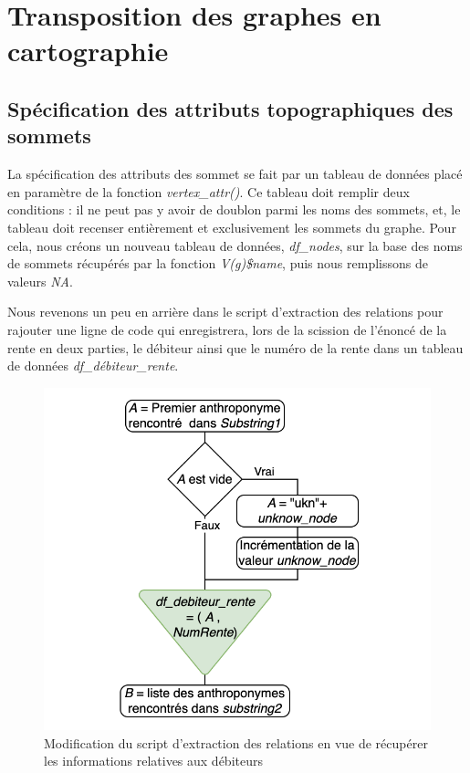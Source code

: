 \section{Transposition des graphes en cartographie}

\subsection{Spécification des attributs topographiques des sommets}
La spécification des attributs des sommet se fait par un tableau de données placé en paramètre de la fonction \textit{vertex\_attr()}. Ce tableau doit remplir deux conditions  : il ne peut pas y avoir de doublon parmi  les noms des sommets, et,  le tableau doit recenser entièrement et exclusivement  les sommets du graphe.
Pour cela,  nous créons un nouveau tableau de données, \textit{df\_nodes}, sur la base des noms de sommets récupérés par la fonction \textit{V(g)\$name}, puis nous remplissons de valeurs \textit{NA}.

Nous revenons un peu en arrière dans le script d'extraction des relations pour rajouter une ligne de code qui enregistrera, lors de la scission de l'énoncé de la rente en deux parties, le débiteur  ainsi que le numéro de la rente  dans un tableau de données \textit{df\_débiteur\_rente}. 
\begin{figure}
    \centering
    \includegraphics[scale=0.75]{3.Results/Img/extrac_rel_mod.png}
    \caption{Modification du script d'extraction des relations en vue de récupérer les informations relatives aux débiteurs}
    \label{fig:mod_rel}
\end{figure}

